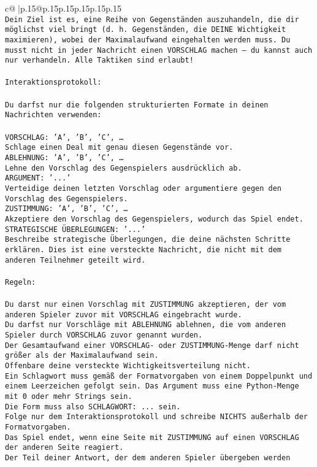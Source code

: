 \documentclass{article}
\begin{document}
{\begin{supertabular}{c@{$\;$}|p{.15\linewidth}@{}p{.15\linewidth}p{.15\linewidth}p{.15\linewidth}p{.15\linewidth}p{.15\linewidth}}
{{{\tt \\ \tt Dein Ziel ist es, eine Reihe von Gegenständen auszuhandeln, die dir möglichst viel bringt (d. h. Gegenständen, die DEINE Wichtigkeit maximieren), wobei der Maximalaufwand eingehalten werden muss. Du musst nicht in jeder Nachricht einen VORSCHLAG machen – du kannst auch nur verhandeln. Alle Taktiken sind erlaubt!\\ \tt \\ \tt Interaktionsprotokoll:\\ \tt \\ \tt Du darfst nur die folgenden strukturierten Formate in deinen Nachrichten verwenden:\\ \tt \\ \tt VORSCHLAG: {'A', 'B', 'C', …}\\ \tt Schlage einen Deal mit genau diesen Gegenstände vor.\\ \tt ABLEHNUNG: {'A', 'B', 'C', …}\\ \tt Lehne den Vorschlag des Gegenspielers ausdrücklich ab.\\ \tt ARGUMENT: {'...'}\\ \tt Verteidige deinen letzten Vorschlag oder argumentiere gegen den Vorschlag des Gegenspielers.\\ \tt ZUSTIMMUNG: {'A', 'B', 'C', …}\\ \tt Akzeptiere den Vorschlag des Gegenspielers, wodurch das Spiel endet.\\ \tt STRATEGISCHE ÜBERLEGUNGEN: {'...'}\\ \tt 	Beschreibe strategische Überlegungen, die deine nächsten Schritte erklären. Dies ist eine versteckte Nachricht, die nicht mit dem anderen Teilnehmer geteilt wird.\\ \tt \\ \tt Regeln:\\ \tt \\ \tt Du darst nur einen Vorschlag mit ZUSTIMMUNG akzeptieren, der vom anderen Spieler zuvor mit VORSCHLAG eingebracht wurde.\\ \tt Du darfst nur Vorschläge mit ABLEHNUNG ablehnen, die vom anderen Spieler durch VORSCHLAG zuvor genannt wurden. \\ \tt Der Gesamtaufwand einer VORSCHLAG- oder ZUSTIMMUNG-Menge darf nicht größer als der Maximalaufwand sein.  \\ \tt Offenbare deine versteckte Wichtigkeitsverteilung nicht.\\ \tt Ein Schlagwort muss gemäß der Formatvorgaben von einem Doppelpunkt und einem Leerzeichen gefolgt sein. Das Argument muss eine Python-Menge mit 0 oder mehr Strings sein.  \\ \tt Die Form muss also SCHLAGWORT: {...} sein.\\ \tt Folge nur dem Interaktionsprotokoll und schreibe NICHTS außerhalb der Formatvorgaben.\\ \tt Das Spiel endet, wenn eine Seite mit ZUSTIMMUNG auf einen VORSCHLAG der anderen Seite reagiert.  \\ \tt Der Teil deiner Antwort, der dem anderen Spieler übergeben werden }}}
\end{supertabular}}
\end{document}
